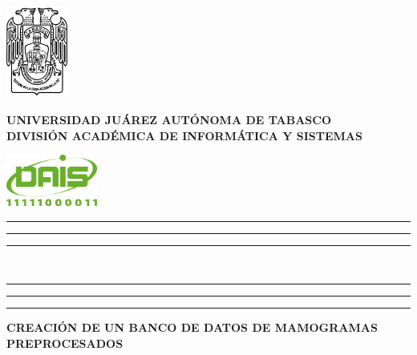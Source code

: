 {%
\newpage
\thispagestyle{empty}
\mbox{}

{\selectfont

    \newpage
    \thispagestyle{empty}

    \setcounter{page}{3}

    \begin{minipage}[ht]{0.14\textwidth}
        \flushleft
        \includegraphics[width=2cm]{images/logo-ujat}
    \end{minipage}
    \begin{minipage}[ht]{0.70\textwidth}
    \centering
    {\selectfont
    {\bfseries{\normalsize UNIVERSIDAD JUÁREZ AUTÓNOMA DE TABASCO}}\\
    {\bfseries{\normalsize DIVISIÓN ACADÉMICA DE INFORMÁTICA Y SISTEMAS}}}
    \end{minipage}
    \begin{minipage}[ht]{0.14\textwidth}
        \flushright
        \includegraphics[width=3cm]{images/logo-dais}
    \end{minipage}

    \rule{\textwidth}{3pt}\vspace*{-\baselineskip}\vspace{7pt}
    \rule{\textwidth}{4pt}\vspace*{-\baselineskip}\vspace{7pt}
    \rule{\textwidth}{3pt}\\[\baselineskip]

    \begin{minipage}[ht]{0.10\textwidth}
        \flushleft
        \rule{3pt}{20cm}
        \rule{4pt}{20cm}
        \rule{3pt}{20cm}
    \end{minipage}
    \begin{minipage}[th]{0.89\textwidth}
    \centering
    {\bfseries{\Large CREACIÓN DE UN BANCO DE DATOS DE MAMOGRAMAS
    PREPROCESADOS}}
    \vspace*{2\baselineskip} \vfill


\end{minipage}}}
